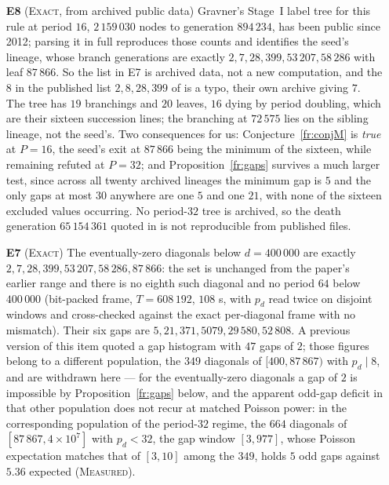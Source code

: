 \documentclass[11pt]{article}
\theoremstyle{definition}
\theoremstyle{remark}
\newcommand{\EXACT}{\textsc{Exact}}
\newcommand{\MEASURED}{\textsc{Measured}}
\begin{document}
\begin{enumerate}
(\texttt{s3\_tau\_convention.py}) reproduces E1 only. E3, the (C) half of E4 and E5 were reproduced separately
from the last-violation array of a second exact per-diagonal run, using no code or data of the paper's frame
($49\,110$ plateaus, $0$ discrepancies), and E2 by the two later computations named in E2; the (U) half of
E4, which needs $\mu_i$ and hence the defect sequences themselves, has not been independently reproduced. Note also that $P_d=\max(p_{d-1},p_d,p_{d+1})$ is
flat across a doubling of $p$, the increase of $P$ sitting one diagonal earlier: $P$ reaches $32$ at $d=87\,866$ while $p$
reaches $32$ at $d=87\,867$.
\item[\textbf{E8}] (\EXACT, from archived public data) Gravner's Stage~I label tree for this rule at period $16$, $2\,159\,030$ nodes to generation $894\,234$, has been public since 2012; parsing it in full reproduces those counts and identifies the seed's lineage, whose branch generations are exactly $2,7,28,399,53\,207,58\,286$ with leaf $87\,866$. So the list in E7 is archived data, not a new computation, and the $8$ in the published list $2,8,28,399$ of \cite[\S8]{GG} is a typo, their own archive giving $7$. The tree has $19$ branchings and $20$ leaves, $16$ dying by period doubling, which are their sixteen succession lines; the branching at $72\,575$ lies on the sibling lineage, not the seed's. Two consequences for us: Conjecture~\ref{fr:conjM} is \emph{true} at $P=16$, the seed's exit at $87\,866$ being the minimum of the sixteen, while remaining refuted at $P=32$; and Proposition~\ref{fr:gaps} survives a much larger test, since across all twenty archived lineages the minimum gap is $5$ and the only gaps at most $30$ anywhere are one $5$ and one $21$, with none of the sixteen excluded values occurring. No period-$32$ tree is archived, so the death generation $65\,154\,361$ quoted in \cite[\S8]{GG} is not reproducible from published files.
\item[\textbf{E7}] (\EXACT) The eventually-zero diagonals below $d=400\,000$ are exactly $2,7,28,399,53\,207,58\,286,87\,866$: the set is unchanged from the paper's earlier range and there is no eighth such diagonal and no period $64$ below $400\,000$ (bit-packed frame, $T=608\,192$, $108$ s, with $p_d$ read twice on disjoint windows and cross-checked against the exact per-diagonal frame with no mismatch). Their six gaps are $5,21,371,5079,29\,580,52\,808$. A previous version of this item quoted a gap histogram with $47$ gaps of $2$; those figures belong to a different population, the $349$ diagonals of $[400,87\,867)$ with $p_d\mid8$, and are withdrawn here --- for the eventually-zero diagonals a gap of $2$ is impossible by Proposition~\ref{fr:gaps} below, and the apparent odd-gap deficit in that other population does not recur at matched Poisson power: in the corresponding population of the period-$32$ regime, the $664$ diagonals of $[87\,867,4\times10^{7}]$ with $p_d<32$, the gap window $[3,977]$, whose Poisson expectation matches that of $[3,10]$ among the $349$, holds $5$ odd gaps against $5.36$ expected (\MEASURED).

\end{enumerate}
\end{document}
